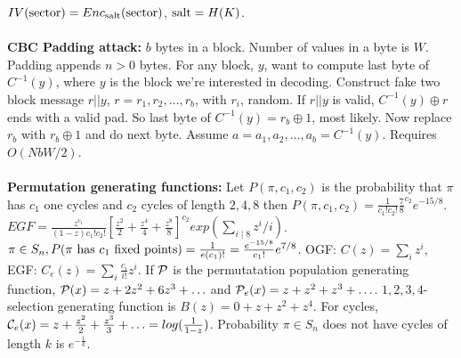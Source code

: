 $IV(\textnormal{sector})= Enc_{\textnormal{salt}}(\textnormal{sector})$, $\textnormal{salt}= H(K)$.
\\
\\
{\bf CBC Padding attack:}
$b$ bytes in a block.  Number of values in a byte is $W$.
Padding appends $n>0$ bytes.  For any block, $y$, want to compute
last byte of $C^{-1}(y)$, where $y$ is the block we're interested
in decoding.
Construct fake two block message $r||y$, $r= r_1, r_2, \ldots, r_b$,
with $r_i$, random.  If $r||y$ is valid, 
$C^{-1}(y) \oplus r$ ends with a valid pad.
So last byte of $C^{-1}(y)= r_b \oplus 1$, most likely.  
Now replace $r_b$ with $r_b \oplus 1$ and do next byte.
Assume $a= a_1, a_2, \ldots, a_b= C^{-1}(y)$.  Requires $O(NbW/2)$.
\\
\\
{\bf Permutation generating functions:} Let 
$P(\pi, c_1 , c_2)$ is the probability
that $\pi$ has $c_1$ one cycles and $c_2$ cycles of length $2, 4, 8$ then
$P(\pi, c_1 , c_2)= {\frac 1 {c_1! c_2!}} {\frac 7 8}^{c_2} e^{-15/8}$.
$EGF= {\frac {z^{c_1}} {(1-z)c_1! c_2!}} [ {\frac {z^2} {2}} +
{\frac {z^4} {4}} + {\frac {z^8} {8}} ]^{c_2} exp(\sum_{i \mid 8} z^i/i)$.
$\pi \in S_n, P(\pi \textnormal{ has } c_1 \textnormal{ fixed points})= {\frac 1 {e(c_1)!}} =
{\frac {e^{-15/8}} {c_1!}} e^{7/8}$.
OGF: $C(z)= \sum_i z^i$, EGF: $C_e(z)= \sum_i {\frac {c_i} {i!}} z^i$.
If ${\cal P}$ is the permutatation population generating function,
${\cal P}(x)= z + 2 z^2 + 6 z^3 + \ldots $ and
${\cal P}_e(x)= z + z^2 + z^3 + \ldots $.  $1, 2, 3, 4$-selection generating function is
$B(z)= 0 + z + z^2 + z^4$.  For cycles,
${\cal C}_e(x)= z + {\frac {z^2}{2}} + {\frac {z^3}{3}} + \ldots = log({\frac 1 {1-z}})$. 
Probability $\pi \in S_n$ does not have cycles of length $k$ is
$e^{-{\frac 1 k}}$.
